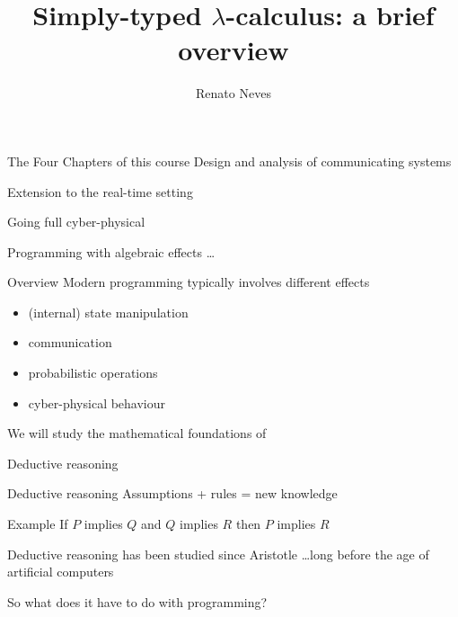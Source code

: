 \documentclass{beamer}
\author[Renato Neves]{Renato Neves}
\date{}
\begin{document}
\title{Simply-typed $\lambda$-calculus: a brief overview}

\frame[plain]{\titlepage}


\begin{slide}{The Four Chapters of this course}
  Design and analysis of \alert{communicating} systems  

  Extension to the \alert{real-time} setting

  Going full \alert{cyber-physical}

  Programming with \alert{algebraic effects} \dots
\end{slide}

\begin{slide}{Overview}
        Modern programming typically involves different \alert{effects}
  \begin{itemize}
  \item (internal) state manipulation
  \item \alert{communication}
  \item probabilistic operations
  \item \alert{cyber-physical} behaviour
  \end{itemize}

  \vfill
  We will study the \alert{mathematical} foundations of 
\end{slide}

\begin{slide}{Deductive reasoning}
  \begin{block}{Deductive reasoning}
          Assumptions + rules =  new knowledge
  \end{block}

  \begin{block}{Example}
        If $P$ implies $Q$ and $Q$ implies $R$ then $P$ implies $R$
  \end{block}

  Deductive reasoning has been studied since Aristotle \dots long before the
  age of artificial computers 

  So what does it have to do with programming?
\end{slide}
\end{document}
